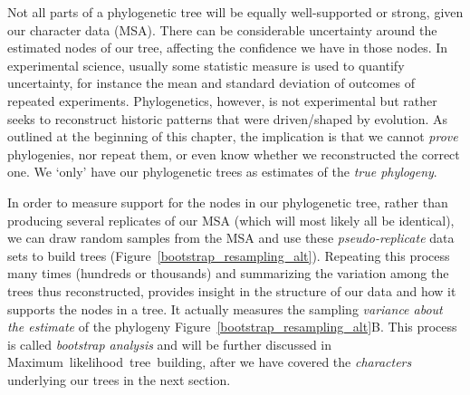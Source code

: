 Not all parts of a phylogenetic tree will be equally well-supported or strong, given our character data (MSA).
There can be considerable uncertainty around the estimated nodes of our tree, affecting the confidence we have in those nodes.
In experimental science, usually some statistic measure is used to quantify uncertainty, for instance the mean and standard deviation of outcomes of repeated experiments.
Phylogenetics, however, is not experimental but rather seeks to reconstruct historic patterns that were driven/shaped by evolution.
As outlined at the beginning of this chapter, the implication is that we cannot \textit{prove} phylogenies, nor repeat them, or even know whether we reconstructed the correct one.
We `only' have our phylogenetic trees as estimates of the \textit{true phylogeny}.

In order to measure support for the nodes in our phylogenetic tree, rather than producing several replicates of our MSA (which will most likely all be identical), we can draw random samples from the MSA and use these \textit{pseudo-replicate} data sets to build trees (Figure~\ref{bootstrap_resampling_alt}).
Repeating this process many times (hundreds or thousands) and summarizing the variation among the trees thus reconstructed, provides insight in the structure of our data and how it supports the nodes in a tree.
It actually measures the sampling \textit{variance about the estimate} of the phylogeny Figure~\ref{bootstrap_resampling_alt}B.
This process is called \textit{bootstrap analysis} and will be further discussed in Maximum~likelihood~tree~building, after we have covered the \textit{characters} underlying our trees in the next section.

% 

